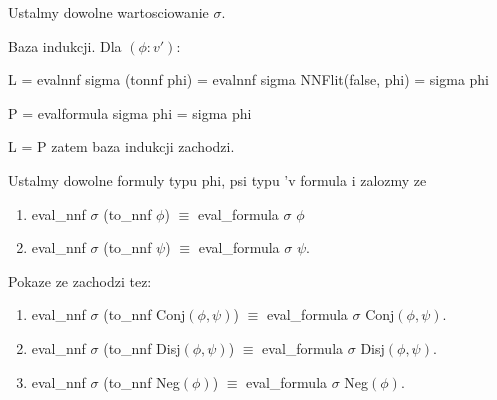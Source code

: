 \documentclass{article}
\begin{document}
Ustalmy dowolne wartosciowanie $\sigma$.

Baza indukcji. Dla $(\phi : v')$:

L = evalnnf sigma (tonnf phi) = evalnnf sigma NNFlit(false, phi) = sigma phi

P = evalformula sigma phi = sigma phi

L = P zatem baza indukcji zachodzi.

Ustalmy dowolne formuly typu phi, psi typu 'v formula i zalozmy ze

\begin{enumerate}[label=(\roman*)]
    \item eval\_nnf $\sigma$ (to\_nnf $\phi$) $\equiv$ eval\_formula $\sigma$ $\phi$
    \item eval\_nnf $\sigma$ (to\_nnf $\psi$) $\equiv$ eval\_formula $\sigma$ $\psi$.
    
\end{enumerate}

Pokaze ze zachodzi tez:

\begin{enumerate}[label=(\alph*)]
    \item eval\_nnf $\sigma$ (to\_nnf Conj$(\phi, \psi)$) $\equiv$ eval\_formula $\sigma$ Conj$(\phi, \psi)$. 
    \item eval\_nnf $\sigma$ (to\_nnf Disj$(\phi, \psi)$) $\equiv$ eval\_formula $\sigma$ Disj$(\phi, \psi)$.
    \item eval\_nnf $\sigma$ (to\_nnf Neg$(\phi)$) $\equiv$ eval\_formula $\sigma$ Neg$(\phi)$.
\end{enumerate}
\end{document}
